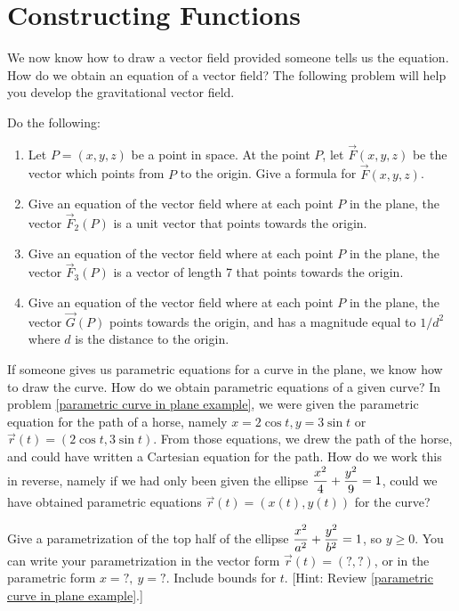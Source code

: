 \section{Constructing Functions}
We now know how to draw a vector field provided someone tells us the equation. How do we obtain an equation of a vector field? The following problem will help you develop the gravitational vector field.

\begin{problem}
%
%
Do the following:
\begin{enumerate}
 \item Let $P=(x,y,z)$ be a point in space.  At the point $P$, let $\vec F(x,y,z)$ be the vector which points from $P$ to the origin.  Give a formula for $\vec F(x,y,z)$.
 \item Give an equation of the vector field where at each point $P$ in the plane, the vector $\vec F_2(P)$ is a unit vector that points towards the origin.
 \item Give an equation of the vector field where at each point $P$ in the plane, the vector $\vec F_3(P)$ is a vector of length 7 that points towards the origin.
 \item Give an equation of the vector field where at each point $P$ in the plane, the vector $\vec G(P)$ points towards the origin, and has a magnitude equal to $1/d^2$ where $d$ is the distance to the origin.
\end{enumerate}
\end{problem}

If someone gives us parametric equations for a curve in the plane, we know how to draw the curve.  How do we obtain parametric equations of a given curve? In problem \ref{parametric curve in plane example}, we were given the parametric equation for the path of a horse, namely $x=2\cos t, y=3 \sin t$ or $\vec r(t)=(2\cos t,3\sin t)$. From those equations, we drew the path of the horse, and could have written a Cartesian equation for the path. How do we work this in reverse, namely if we had only been given the ellipse $\displaystyle\frac{x^2}{4}+\frac{y^2}{9}=1$, could we have obtained parametric equations $\vec r(t)=(x(t),y(t))$ for the curve?

\begin{problem}\label{parameterizing plane curves}
%
 Give a parametrization of the top half of the ellipse $\displaystyle\frac{x^2}{a^2}+\frac{y^2}{b^2}=1$, so $y\geq 0$.
 You can write your parametrization in the vector form $\vec r(t)=(?,?)$, or in the parametric form $x=?,\ y=?$. 
 Include bounds for $t$. 
 [Hint: Review \ref{parametric curve in plane example}.]
\end{problem}


